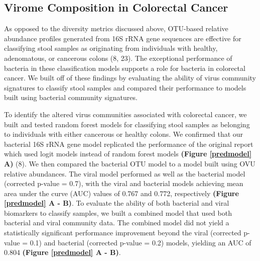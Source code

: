 \documentclass[12pt,]{article}
\begin{document}
\subsection{Virome Composition in Colorectal
Cancer}\label{virome-composition-in-colorectal-cancer}

As opposed to the diversity metrics discussed above, OTU-based relative
abundance profiles generated from 16S rRNA gene sequences are effective
for classifying stool samples as originating from individuals with
healthy, adenomatous, or cancerous colons (8, 23). The exceptional
performance of bacteria in these classification models supports a role
for bacteria in colorectal cancer. We built off of these findings by
evaluating the ability of virus community signatures to classify stool
samples and compared their performance to models built using bacterial
community signatures.

To identify the altered virus communities associated with colorectal
cancer, we built and tested random forest models for classifying stool
samples as belonging to individuals with either cancerous or healthy
colons. We confirmed that our bacterial 16S rRNA gene model replicated
the performance of the original report which used logit models instead
of random forest models \textbf{(Figure \ref{predmodel} A)} (8). We then
compared the bacterial OTU model to a model built using OVU relative
abundances. The viral model performed as well as the bacterial model
(corrected p-value = 0.7), with the viral and bacterial models achieving
mean area under the curve (AUC) values of 0.767 and 0.772, respectively
\textbf{(Figure \ref{predmodel} A - B)}. To evaluate the ability of both
bacterial and viral biomarkers to classify samples, we built a combined
model that used both bacterial and viral community data. The combined
model did not yield a statistically significant performance improvement
beyond the viral (corrected p-value = 0.1) and bacterial (corrected
p-value = 0.2) models, yielding an AUC of 0.804 \textbf{(Figure
\ref{predmodel} A - B)}.
\end{document}
